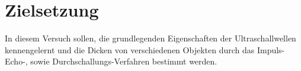 \section{Zielsetzung} 

\begin{flushleft}
    In diesem Versuch sollen, die grundlegenden Eigenschaften der Ultraschallwellen kennengelernt und die Dicken von verschiedenen Objekten durch das Impuls-Echo-, sowie Durchschallungs-Verfahren bestimmt werden.
\end{flushleft}